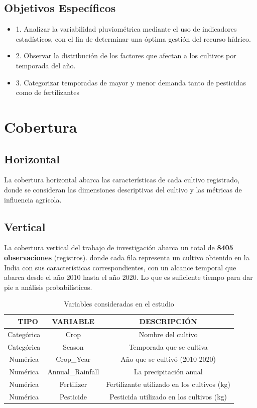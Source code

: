 \documentclass[oneside,11pt]{Latex/Classes/PhDthesisPSnPDF}
\begin{document}
\subsection{Objetivos Específicos}
\begin{itemize}
  \item{1.      Analizar la variabilidad pluviométrica mediante el uso de indicadores estadísticos, con el fin de determinar una óptima gestión del recurso hídrico.}
  \item{2.      Observar la distribución de los factores que afectan a los cultivos por temporada del año.}
  \item{3.      Categorizar temporadas de mayor y menor demanda tanto de pesticidas como de fertilizantes}
\end{itemize}

\section{Cobertura}

\subsection{Horizontal}

La cobertura horizontal abarca las características de cada cultivo
registrado, donde se consideran las dimensiones descriptivas del cultivo
y las métricas de influencia agrícola.\\

\subsection{Vertical}

La cobertura vertical del trabajo de investigación abarca un total de
\textbf{8405 observaciones} (registros). donde cada fila representa un
cultivo obtenido en la India con sus características correspondientes,
con un alcance temporal que abarca desde el año 2010 hasta el año 2020.
Lo que es suficiente tiempo para dar pie a análisis probabilísticos.

\begin{table}[ht]
\centering
\caption{Variables consideradas en el estudio} 
\resizebox{10cm}{!} {
\begin{tabular}{ccc}
  \hline
\ \ \textbf{TIPO} &  \textbf{VARIABLE} & \textbf{DESCRIPCIÓN} \\ 
  \hline
   Categórica & Crop & Nombre del cultivo \\ 
Categórica &  Season & Temporada que se cultiva \\ 
 Numérica & Crop\_Year & Año que se cultivó (2010-2020) \\
 Numérica & Annual\_Rainfall & La precipitación anual  \\
 Numérica & Fertilizer & Fertilizante utilizado en los cultivos (kg) \\
 Numérica & Pesticide & Pesticida  utilizado en los cultivos (kg)  \\

   \hline
\end{tabular}
}
\end{table}
\end{document}
